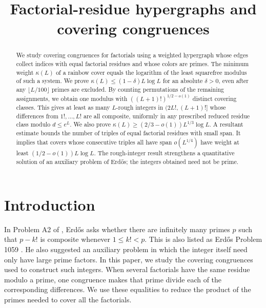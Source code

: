 \documentclass[11pt]{amsart}
\title[Factorial-residue hypergraphs]
{Factorial-residue hypergraphs and covering congruences}
\author{}
\date{}
\theoremstyle{definition}
\theoremstyle{remark}
\begin{document}
\begin{abstract}
We study covering congruences for factorials using a weighted hypergraph
whose edges collect indices with equal factorial residues and whose
colors are primes. The minimum
weight $\kappa(L)$ of a rainbow cover equals the logarithm of the least
squarefree modulus of such a system. We prove
$\kappa(L)\leq(1-\delta)L\log L$ for an absolute $\delta>0$, even after
any $\lfloor L/100\rfloor$ primes are excluded. By counting permutations
of the remaining assignments, we obtain one modulus with
$((L+1)!)^{1/2-o(1)}$ distinct covering classes. This gives at least as
many $L$-rough integers in $(2L!,(L+1)!]$ whose differences from
$1!,\ldots,L!$ are all composite, uniformly in any prescribed reduced
residue class modulo $d\leq e^L$. We also prove
$\kappa(L)\geq(2/3-o(1))L^{1/3}\log L$. A resultant estimate bounds
the number of triples of equal factorial residues with small span. It
implies that covers whose consecutive triples all have span
$o(L^{1/4})$ have weight at least $(1/2-o(1))L\log L$.
The rough-integer result strengthens a quantitative solution of an
auxiliary problem of Erd\H{o}s; the integers obtained need not be prime.
\end{abstract}

\maketitle

\section{Introduction}\label{sec:intro}

In Problem A2 of \cite{Guy}, Erd\H{o}s asks whether there are infinitely
many primes $p$ such that $p-k!$ is composite whenever $1\leq k!<p$.
This is also listed as Erd\H{o}s Problem 1059 \cite{Bloom}. He also
suggested an auxiliary problem in which the integer itself need only
have large prime factors. In this paper, we study the covering
congruences used to construct such integers. When several factorials
have the same residue modulo a prime, one congruence makes that prime
divide each of the corresponding differences. We use these equalities
to reduce the product of the primes needed to cover all the factorials.
\end{document}
